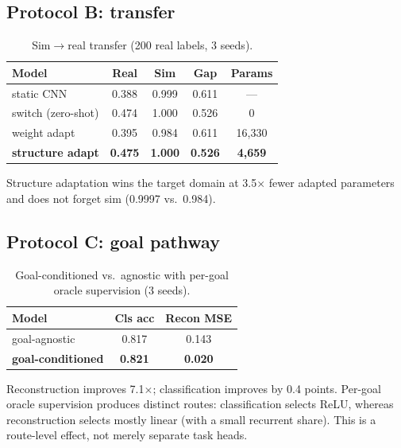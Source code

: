 \documentclass[conference,10pt]{IEEEtran}
\begin{document}
\subsection{Protocol B: transfer}\label{sec:B}
\begin{table}[h]
\centering
\caption{Sim$\to$real transfer (200 real labels, 3 seeds).}
\label{tab:b}
\begin{tabular}{lcccc}
\toprule
Model & Real & Sim & Gap & Params\\
\midrule
static CNN & 0.388 & 0.999 & 0.611 & ---\\
switch (zero-shot) & 0.474 & 1.000 & 0.526 & 0\\
weight adapt & 0.395 & 0.984 & 0.611 & 16{,}330\\
\textbf{structure adapt} & \textbf{0.475} & \textbf{1.000} & \textbf{0.526} & \textbf{4{,}659}\\
\bottomrule
\end{tabular}
\end{table}
Structure adaptation wins the target domain at 3.5$\times$ fewer adapted parameters and does not forget sim (0.9997 vs.\ 0.984).

\subsection{Protocol C: goal pathway}\label{sec:C}
\begin{table}[h]
\centering
\caption{Goal-conditioned vs.\ agnostic with per-goal oracle supervision (3 seeds).}
\label{tab:c}
\begin{tabular}{lcc}
\toprule
Model & Cls acc & Recon MSE\\
\midrule
goal-agnostic & 0.817 & 0.143\\
\textbf{goal-conditioned} & \textbf{0.821} & \textbf{0.020}\\
\bottomrule
\end{tabular}
\end{table}
Reconstruction improves 7.1$\times$; classification improves by 0.4 points. Per-goal oracle supervision produces distinct routes: classification selects ReLU, whereas reconstruction selects mostly linear (with a small recurrent share). This is a route-level effect, not merely separate task heads.
\end{document}
